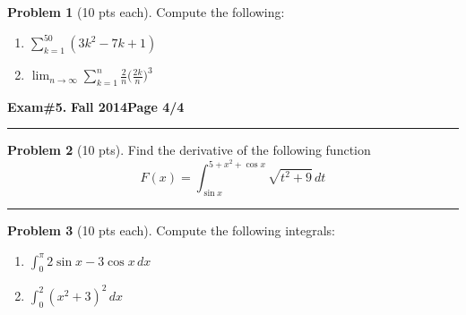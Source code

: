 \documentclass[12pt]{article}
\theoremstyle{definition}
\newtheorem{problem}{Problem}
\begin{document}
\begin{problem}[10 pts each] 
Compute the following:
\begin{enumerate}
\item $\displaystyle{\sum_{k=1}^{50} (3k^2-7k+1)}$
\vspace{2cm}
\begin{flushright}
\end{flushright}
\item $\displaystyle{\lim_{n\to \infty} \sum_{k=1}^n \frac{2}{n} \bigg( \frac{2k}{n}\bigg)^3}$
\vspace{3.5cm}
\begin{flushright}
\end{flushright}
\end{enumerate}
\end{problem}
\newpage

\hfill{\large\bf Exam\#5.}\hfill{\large\bf
Fall 2014}\hfill{\large\bf Page 4/4}\hrule

\bigskip

\begin{problem}[10 pts] 
Find the derivative of the following function
\begin{equation*}
F(x) = \int_{\sin x}^{5+x^2+\cos x} \sqrt{t^2 + 9} \, dt
\end{equation*}

\vspace{4cm}
\begin{flushright}
\end{flushright}
\end{problem}
\hrule 

\begin{problem}[10 pts each] 
Compute the following integrals:
\begin{enumerate}
\item $\displaystyle{\int_0^{\pi} 2\sin x - 3\cos x \, dx}$
\vspace{3.5cm}
\begin{flushright}
\end{flushright}
\item $\displaystyle{\int_0^2 (x^2+3)^2\, dx}$
\vspace{4cm}
\begin{flushright}
\end{flushright}
\end{enumerate}
\end{problem}
\end{document}
